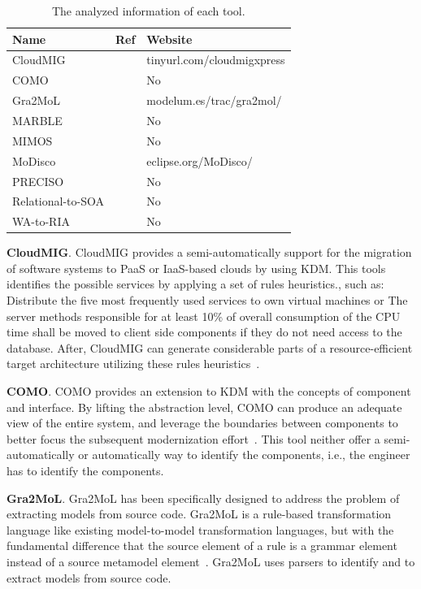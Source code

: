 
\begin{table}
\scriptsize
\centering
\caption{The analyzed information of each tool.}
  \begin{tabular}{|l|l|l|}
\hline 
\cellcolor{gray}Name & \cellcolor{gray}Ref & \cellcolor{gray}Website\tabularnewline
\hline 
\hline 
CloudMIG &\cite{SMR:SMR582}  & tinyurl.com/cloudmigxpress\tabularnewline
\hline 
COMO &\cite{5773392}  & No\tabularnewline
\hline 
Gra2MoL &\cite{5440163}  & modelum.es/trac/gra2mol/\tabularnewline
\hline 
MARBLE &  & No\tabularnewline
\hline 
MIMOS &~\cite{6498507} & No\tabularnewline
\hline 
MoDisco &~\cite{Bruneliere:2010:MGE:1858996.1859032} & eclipse.org/MoDisco/\tabularnewline
\hline 
PRECISO &~\cite{delCastillo:2009:PRP:1529282.1529753}  & No\tabularnewline
\hline 
Relational-to-SOA &~\cite{Guzman:2007:AAR:1339262.1339532} & No\tabularnewline
\hline 
WA-to-RIA &~\cite{Rodriguez-Echeverria:2011:MLW:2186508.2186536}  & No\tabularnewline
\hline 
\end{tabular}
\label{tab:tools}
\end{table}



\textbf{CloudMIG}. CloudMIG provides a semi-automatically support for the migration of software systems to PaaS or IaaS-based clouds by using KDM. This tools identifies the possible services by applying a set of rules heuristics., such as: Distribute the five most frequently used services to own virtual machines or The server methods responsible for at least 10\% of overall consumption of the CPU time shall be moved to client side components if they do not need access to the database. After, CloudMIG can generate considerable parts of a resource-efficient target architecture utilizing these rules heuristics~\cite{SMR:SMR582}. 

\textbf{COMO}. COMO provides an extension to KDM with the concepts of component and interface. By lifting the abstraction level, COMO can produce an adequate view of the entire system, and leverage the boundaries between components to better focus the subsequent modernization effort~\cite{5773392}. This tool neither offer a semi-automatically or automatically way to identify the components, i.e., the engineer has to identify the components.

\textbf{Gra2MoL}. Gra2MoL has been specifically designed to address the problem of extracting models from source code. Gra2MoL is a rule-based transformation language like existing model-to-model transformation languages, but with the fundamental difference that the source element of a rule is a grammar element instead of a source metamodel element~\cite{5440163}. Gra2MoL uses parsers to identify and to extract models from source code.

